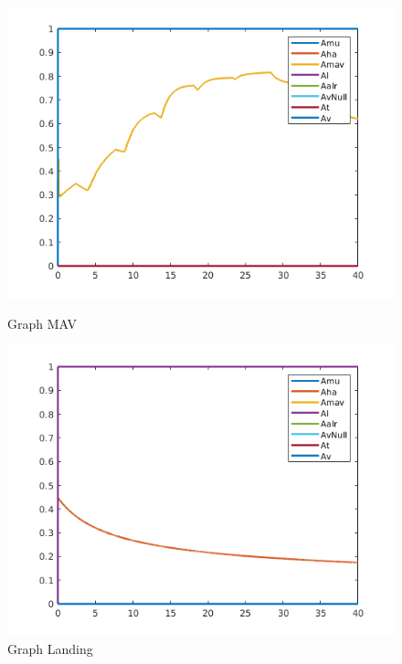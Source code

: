\documentclass{article}
\begin{document}
\begin{figure}[!h]
    \centering
    \begin{minipage}{0.50\textwidth}
    \includegraphics[scale=0.5]{213_MAV_A.png}
    \caption{Graph MAV}
    \end{minipage}
\hfill
    \centering
    \begin{minipage}{0.50\textwidth}
    \includegraphics[scale=0.5]{213_Landing_A.png}
    \caption{Graph Landing}
    \end{minipage}
\end{figure}

\clearpage
\end{document}
